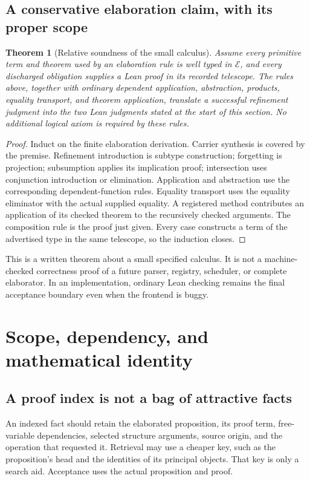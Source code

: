 \documentclass[11pt,a4paper]{article}
\theoremstyle{plain}
\newtheorem{theorem}{Theorem}[section]
\theoremstyle{definition}
\begin{document}
\subsection{A conservative elaboration claim, with its proper scope}
\begin{theorem}[Relative soundness of the small calculus]
Assume every primitive term and theorem used by an elaboration rule is well typed in $\mathcal E$, and every discharged obligation supplies a Lean proof in its recorded telescope. The rules above, together with ordinary dependent application, abstraction, products, equality transport, and theorem application, translate a successful refinement judgment into the two Lean judgments stated at the start of this section. No additional logical axiom is required by these rules.
\end{theorem}
\begin{proof}
Induct on the finite elaboration derivation. Carrier synthesis is covered by the premise. Refinement introduction is subtype construction; forgetting is projection; subsumption applies its implication proof; intersection uses conjunction introduction or elimination. Application and abstraction use the corresponding dependent-function rules. Equality transport uses the equality eliminator with the actual supplied equality. A registered method contributes an application of its checked theorem to the recursively checked arguments. The composition rule is the proof just given. Every case constructs a term of the advertised type in the same telescope, so the induction closes.
\end{proof}
This is a written theorem about a small specified calculus. It is not a machine-checked correctness proof of a future parser, registry, scheduler, or complete elaborator. In an implementation, ordinary Lean checking remains the final acceptance boundary even when the frontend is buggy.

\section{Scope, dependency, and mathematical identity}\label{sec:scope}

\subsection{A proof index is not a bag of attractive facts}
An indexed fact should retain the elaborated proposition, its proof term, free-variable dependencies, selected structure arguments, source origin, and the operation that requested it. Retrieval may use a cheaper key, such as the proposition's head and the identities of its principal objects. That key is only a search aid. Acceptance uses the actual proposition and proof.
\end{document}
